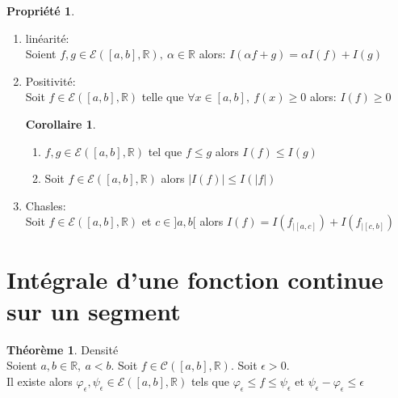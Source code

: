 \documentclass[fleqn]{article}
\theoremstyle{definition} \newtheorem*{defi}{D\'efinition}
\theoremstyle{definition} \newtheorem*{theo}{Th\'eor\`eme}
\theoremstyle{definition} \newtheorem*{coro}{Corollaire}
\theoremstyle{remark} \newtheorem*{rqs}{Remarques}
\theoremstyle{definition} \newtheorem*{prop}{Propri\'et\'e}
\begin{document}
\begin{prop} $ $
	\begin{enumerate}
		\item lin\'earit\'e: \\
			Soient $f,g \in \mathcal{E}([a,b], \mathbb{R}),\ \alpha \in \mathbb{R}$ alors: $I(\alpha f + g) = \alpha I(f) + I(g)$
		\item Positivit\'e: \\
			Soit $f \in \mathcal{E}([a,b], \mathbb{R})$ telle que $\forall x \in [a,b],\ f(x) \geq 0$ alors: $I(f) \geq 0$
			\begin{coro} $ $
				\begin{enumerate}
					\item $f,g \in \mathcal{E}([a,b], \mathbb{R})$ tel que $f \leq g$ alors $I(f) \leq I(g)$
					\item Soit $f \in \mathcal{E}([a,b], \mathbb{R})$ alors $|I(f)| \leq I(|f|)$
				\end{enumerate}
			\end{coro}
		\item Chasles: \\
			Soit $f \in \mathcal{E}([a,b], \mathbb{R})$ et $c \in ]a,b[$ alors $I(f) = I(f_{|[a,c]}) + I(f_{|[c,b]})$
	\end{enumerate}
\end{prop}

\section{Int\'egrale d'une fonction continue sur un segment}
\begin{theo} Densit\'e \\
	Soient $a,b \in \mathbb{R},\ a < b$. Soit $f \in \mathscr{C}([a,b], \mathbb{R})$. Soit $\epsilon > 0$. \\
	Il existe alors $\varphi_{\epsilon}, \psi_{\epsilon} \in \mathcal{E}([a,b], \mathbb{R})$ tels que $\varphi_{\epsilon} \leq f
	\leq \psi_{\epsilon}$ et $\psi_{\epsilon} - \varphi_{\epsilon} \leq \epsilon$
\end{theo}
\end{document}
